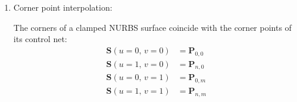 \begin{enumerate}
    The derivatives of $\mathbf{A}(u,v)$ and $w(u,v)$ can be easily computed by differentiating $\mathbf{S}^{w}(u,v)$:
        \begin{align*}
             \left[\mathbf{S}^{w}\right]^{(k,l)}(u,v)  = \sum_{i=0}^{n}\sum_{j=0}^{m} N^{(k)}_{i,p}(u)N^{(l)}_{j,q}(u)\, \mathbf{P}^{w}_{i,j}
        \end{align*}
        
    \item Corner point interpolation:
    
    The corners of a clamped NURBS surface coincide with the corner points of its control net:
    \begin{align*}
        \mathbf{S}(u=0,\, v=0) &= \mathbf{P}_{0, 0} \\
        \mathbf{S}(u=1,\, v=0) &= \mathbf{P}_{n, 0} \\
        \mathbf{S}(u=0,\, v=1) &= \mathbf{P}_{0, m} \\
        \mathbf{S}(u=1,\, v=1) &= \mathbf{P}_{n, m} \\
    \end{align*}
    

    
\end{enumerate}



